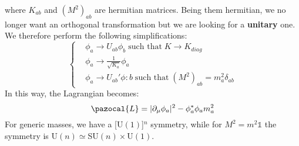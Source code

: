 \documentclass[../main.tex]{subfiles}
\begin{document}
where $K_{ab}$ and $(M^2)_{ab}$ are hermitian matrices. Being them hermitian, we no longer want an orthogonal transformation but we are looking for a \textbf{unitary} one. We therefore perform the following simplifications:
\[
\left\{
\begin{aligned}
&\phi_a\to U_{ab}\phi_b \;\text{such that}\;K\to K_{diag}\\
&\phi_a\to\frac{1}{\sqrt{K_a}}\phi_a\\
&\phi_a\to U_{ab}'\phi:b \;\text{such that}\;(M^2)_{ab}=m_a^2\delta_{ab}
\end{aligned}
\right.
\]
In this way, the Lagrangian becomes:
\[
\pazocal{L}=|\partial_\mu\phi_a|^2-\phi_a^*\phi_am_a^2
\]
For generic masses, we have a [U$(1)$]$^n$ symmetry, while for $M^2=m^2\mathbb{1}$ the symmetry is U$(n)\simeq$SU$(n)\times$U$(1)$.
\end{document}
